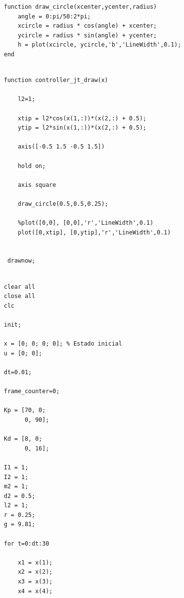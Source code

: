 \documentclass{article}
\begin{document}
\begin{itemize}
\begin{tcolorbox}
\begin{scriptsize}
\begin{verbatim}
function draw_circle(xcenter,ycenter,radius)
    angle = 0:pi/50:2*pi;
    xcircle = radius * cos(angle) + xcenter;
    ycircle = radius * sin(angle) + ycenter;
    h = plot(xcircle, ycircle,'b','LineWidth',0.1);
end

\end{verbatim}
\end{scriptsize}
\end{tcolorbox}


\begin{tcolorbox}
[
title={File \texttt{controller\_jt\_draw.m}}      
]
\begin{scriptsize}
\begin{verbatim}

function controller_jt_draw(x)

    l2=1;

    xtip = l2*cos(x(1,:))*(x(2,:) + 0.5);
    ytip = l2*sin(x(1,:))*(x(2,:) + 0.5);

    axis([-0.5 1.5 -0.5 1.5])

    hold on;

    axis square

    draw_circle(0.5,0.5,0.25);

    %plot([0,0], [0,0],'r','LineWidth',0.1)
    plot([0,xtip], [0,ytip],'r','LineWidth',0.1)
 

 drawnow;

\end{verbatim}
\end{scriptsize}
\end{tcolorbox}


\begin{tcolorbox}
[
title={File \texttt{controller\_jt\_main.m}}      
]
\begin{scriptsize}
\begin{verbatim}

clear all
close all
clc

init;

x = [0; 0; 0; 0]; % Estado inicial
u = [0; 0];

dt=0.01;

frame_counter=0;
 
Kp = [70, 0;
      0, 90];

Kd = [8, 0;
      0, 16];

I1 = 1;
I2 = 1;
m2 = 1;
d2 = 0.5;
l2 = 1;
r = 0.25;
g = 9.81;

for t=0:dt:30

    x1 = x(1);
    x2 = x(2);
    x3 = x(3);
    x4 = x(4);


\end{verbatim}
\end{scriptsize}
\end{tcolorbox}
\end{itemize}
\end{document}
